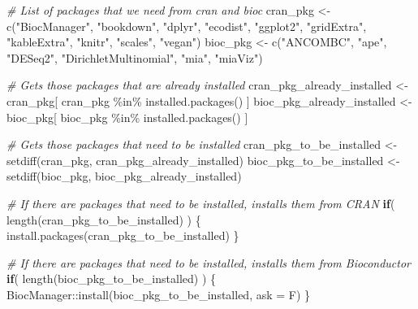 \documentclass[
  oneside]{book}
\newenvironment{Shaded}{\begin{snugshade}}{\end{snugshade}}
\newcommand{\AttributeTok}[1]{\textcolor[rgb]{0.77,0.63,0.00}{#1}}
\newcommand{\CommentTok}[1]{\textcolor[rgb]{0.56,0.35,0.01}{\textit{#1}}}
\newcommand{\ControlFlowTok}[1]{\textcolor[rgb]{0.13,0.29,0.53}{\textbf{#1}}}
\newcommand{\FunctionTok}[1]{\textcolor[rgb]{0.00,0.00,0.00}{#1}}
\newcommand{\NormalTok}[1]{#1}
\newcommand{\OtherTok}[1]{\textcolor[rgb]{0.56,0.35,0.01}{#1}}
\newcommand{\SpecialCharTok}[1]{\textcolor[rgb]{0.00,0.00,0.00}{#1}}
\newcommand{\StringTok}[1]{\textcolor[rgb]{0.31,0.60,0.02}{#1}}
\begin{document}
\begin{Shaded}
\begin{Highlighting}[]
\CommentTok{\# List of packages that we need from cran and bioc }
\NormalTok{cran\_pkg }\OtherTok{\textless{}{-}} \FunctionTok{c}\NormalTok{(}\StringTok{"BiocManager"}\NormalTok{, }\StringTok{"bookdown"}\NormalTok{, }\StringTok{"dplyr"}\NormalTok{, }\StringTok{"ecodist"}\NormalTok{, }\StringTok{"ggplot2"}\NormalTok{, }
              \StringTok{"gridExtra"}\NormalTok{, }\StringTok{"kableExtra"}\NormalTok{, }\StringTok{"knitr"}\NormalTok{, }\StringTok{"scales"}\NormalTok{, }\StringTok{"vegan"}\NormalTok{)}
\NormalTok{bioc\_pkg }\OtherTok{\textless{}{-}} \FunctionTok{c}\NormalTok{(}\StringTok{"ANCOMBC"}\NormalTok{, }\StringTok{"ape"}\NormalTok{, }\StringTok{"DESeq2"}\NormalTok{,  }\StringTok{"DirichletMultinomial"}\NormalTok{, }\StringTok{"mia"}\NormalTok{, }\StringTok{"miaViz"}\NormalTok{)}

\CommentTok{\# Gets those packages that are already installed}
\NormalTok{cran\_pkg\_already\_installed }\OtherTok{\textless{}{-}}\NormalTok{ cran\_pkg[ cran\_pkg }\SpecialCharTok{\%in\%} \FunctionTok{installed.packages}\NormalTok{() ]}
\NormalTok{bioc\_pkg\_already\_installed }\OtherTok{\textless{}{-}}\NormalTok{ bioc\_pkg[ bioc\_pkg }\SpecialCharTok{\%in\%} \FunctionTok{installed.packages}\NormalTok{() ]}

\CommentTok{\# Gets those packages that need to be installed}
\NormalTok{cran\_pkg\_to\_be\_installed }\OtherTok{\textless{}{-}} \FunctionTok{setdiff}\NormalTok{(cran\_pkg, cran\_pkg\_already\_installed)}
\NormalTok{bioc\_pkg\_to\_be\_installed }\OtherTok{\textless{}{-}} \FunctionTok{setdiff}\NormalTok{(bioc\_pkg, bioc\_pkg\_already\_installed)}
\end{Highlighting}
\end{Shaded}

\begin{Shaded}
\begin{Highlighting}[]
\CommentTok{\# If there are packages that need to be installed, installs them from CRAN}
\ControlFlowTok{if}\NormalTok{( }\FunctionTok{length}\NormalTok{(cran\_pkg\_to\_be\_installed) ) \{}
   \FunctionTok{install.packages}\NormalTok{(cran\_pkg\_to\_be\_installed)}
\NormalTok{\}}
\end{Highlighting}
\end{Shaded}

\begin{Shaded}
\begin{Highlighting}[]
\CommentTok{\# If there are packages that need to be installed, installs them from Bioconductor}
\ControlFlowTok{if}\NormalTok{( }\FunctionTok{length}\NormalTok{(bioc\_pkg\_to\_be\_installed) ) \{}
\NormalTok{   BiocManager}\SpecialCharTok{::}\FunctionTok{install}\NormalTok{(bioc\_pkg\_to\_be\_installed, }\AttributeTok{ask =}\NormalTok{ F)}
\NormalTok{\}}
\end{Highlighting}
\end{Shaded}
\end{document}
